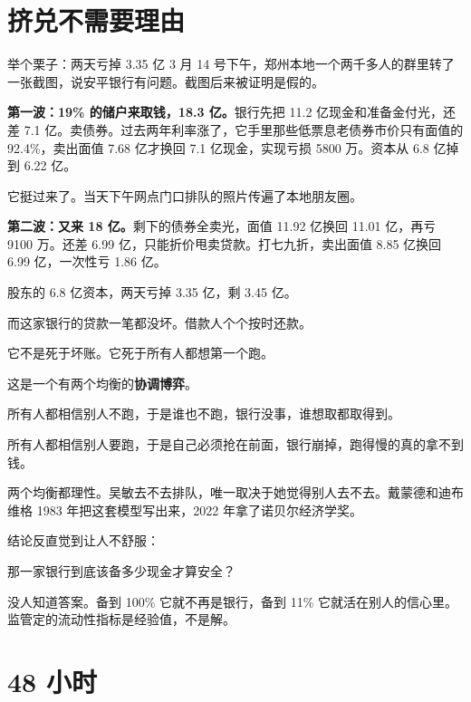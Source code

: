 \section{挤兑不需要理由}

\begin{egbox}{举个栗子：两天亏掉 3.35 亿}
3 月 14 号下午，郑州本地一个两千多人的群里转了一张截图，说安平银行有问题。截图后来被证明是假的。

\textbf{第一波：19\% 的储户来取钱，18.3 亿。}银行先把 11.2 亿现金和准备金付光，还差 7.1 亿。卖债券。过去两年利率涨了，它手里那些低票息老债券市价只有面值的 92.4\%，卖出面值 7.68 亿才换回 7.1 亿现金，实现亏损 5800 万。资本从 6.8 亿掉到 6.22 亿。

它挺过来了。当天下午网点门口排队的照片传遍了本地朋友圈。

\textbf{第二波：又来 18 亿。}剩下的债券全卖光，面值 11.92 亿换回 11.01 亿，再亏 9100 万。还差 6.99 亿，只能折价甩卖贷款。打七九折，卖出面值 8.85 亿换回 6.99 亿，一次性亏 1.86 亿。

股东的 6.8 亿资本，两天亏掉 3.35 亿，剩 3.45 亿。

而这家银行的贷款一笔都没坏。借款人个个按时还款。

它不是死于坏账。它死于所有人都想第一个跑。

\end{egbox}

这是一个有两个均衡的\textbf{协调博弈}。

所有人都相信别人不跑，于是谁也不跑，银行没事，谁想取都取得到。

所有人都相信别人要跑，于是自己必须抢在前面，银行崩掉，跑得慢的真的拿不到钱。

两个均衡都理性。吴敏去不去排队，唯一取决于她觉得别人去不去。戴蒙德和迪布维格 1983 年把这套模型写出来，2022 年拿了诺贝尔经济学奖。

结论反直觉到让人不舒服：

那一家银行到底该备多少现金才算安全？

没人知道答案。备到 100\% 它就不再是银行，备到 11\% 它就活在别人的信心里。监管定的流动性指标是经验值，不是解。

\section{48 小时}

